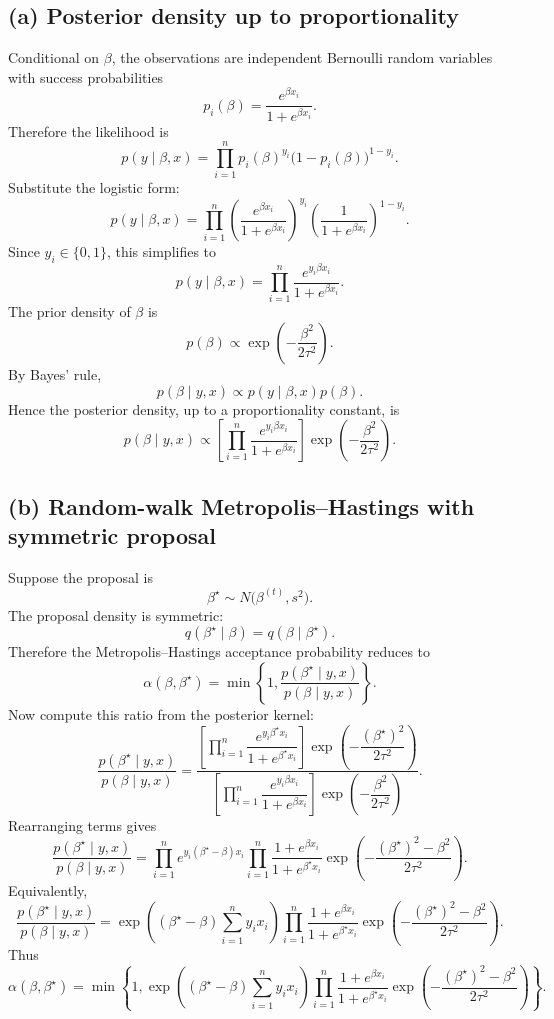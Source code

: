 \documentclass[11pt]{article}
\begin{document}
\subsection*{(a) Posterior density up to proportionality}
Conditional on $\beta$, the observations are independent Bernoulli random variables with success probabilities
\[
p_i(\beta)=\frac{e^{\beta x_i}}{1+e^{\beta x_i}}.
\]
Therefore the likelihood is
\[
p(y\mid\beta,x)=\prod_{i=1}^n p_i(\beta)^{y_i}\bigl(1-p_i(\beta)\bigr)^{1-y_i}.
\]
Substitute the logistic form:
\[
p(y\mid\beta,x)=\prod_{i=1}^n\left(\frac{e^{\beta x_i}}{1+e^{\beta x_i}}\right)^{y_i}
\left(\frac{1}{1+e^{\beta x_i}}\right)^{1-y_i}.
\]
Since $y_i\in\{0,1\}$, this simplifies to
\[
p(y\mid\beta,x)=\prod_{i=1}^n \frac{e^{y_i\beta x_i}}{1+e^{\beta x_i}}.
\]
The prior density of $\beta$ is
\[
p(\beta)\propto \exp\left(-\frac{\beta^2}{2\tau^2}\right).
\]
By Bayes' rule,
\[
p(\beta\mid y,x)\propto p(y\mid\beta,x)p(\beta).
\]
Hence the posterior density, up to a proportionality constant, is
\[
p(\beta\mid y,x)\propto
\left[\prod_{i=1}^n \frac{e^{y_i\beta x_i}}{1+e^{\beta x_i}}\right]
\exp\left(-\frac{\beta^2}{2\tau^2}\right).
\]

\subsection*{(b) Random-walk Metropolis--Hastings with symmetric proposal}
Suppose the proposal is
\[
\beta^\star\sim N\bigl(\beta^{(t)},s^2\bigr).
\]
The proposal density is symmetric:
\[
q(\beta^\star\mid\beta)=q(\beta\mid\beta^\star).
\]
Therefore the Metropolis--Hastings acceptance probability reduces to
\[
\alpha(\beta,\beta^\star)=\min\left\{1,\frac{p(\beta^\star\mid y,x)}{p(\beta\mid y,x)}\right\}.
\]
Now compute this ratio from the posterior kernel:
\[
\frac{p(\beta^\star\mid y,x)}{p(\beta\mid y,x)}
=
\frac{\left[\prod_{i=1}^n \dfrac{e^{y_i\beta^\star x_i}}{1+e^{\beta^\star x_i}}\right]
\exp\left(-\dfrac{(\beta^\star)^2}{2\tau^2}\right)}
{\left[\prod_{i=1}^n \dfrac{e^{y_i\beta x_i}}{1+e^{\beta x_i}}\right]
\exp\left(-\dfrac{\beta^2}{2\tau^2}\right)}.
\]
Rearranging terms gives
\[
\frac{p(\beta^\star\mid y,x)}{p(\beta\mid y,x)}
=
\prod_{i=1}^n e^{y_i(\beta^\star-\beta)x_i}
\prod_{i=1}^n \frac{1+e^{\beta x_i}}{1+e^{\beta^\star x_i}}
\exp\left(-\frac{(\beta^\star)^2-\beta^2}{2\tau^2}\right).
\]
Equivalently,
\[
\frac{p(\beta^\star\mid y,x)}{p(\beta\mid y,x)}
=
\exp\left((\beta^\star-\beta)\sum_{i=1}^n y_ix_i\right)
\prod_{i=1}^n \frac{1+e^{\beta x_i}}{1+e^{\beta^\star x_i}}
\exp\left(-\frac{(\beta^\star)^2-\beta^2}{2\tau^2}\right).
\]
Thus
\[
\alpha(\beta,\beta^\star)=
\min\left\{1,
\exp\left((\beta^\star-\beta)\sum_{i=1}^n y_ix_i\right)
\prod_{i=1}^n \frac{1+e^{\beta x_i}}{1+e^{\beta^\star x_i}}
\exp\left(-\frac{(\beta^\star)^2-\beta^2}{2\tau^2}\right)
\right\}.
\]
\end{document}
